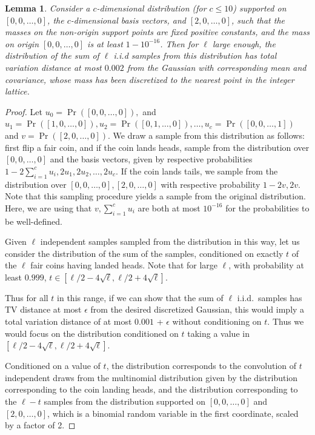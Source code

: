 \documentclass[10pt]{article} %
\theoremstyle{plain}
\newtheorem{lemma}[theorem]{Lemma}
\begin{document}
\begin{lemma}
	\label{lem:clt_new}
	Consider a $c$-dimensional distribution (for $c \le 10$) supported on $[0,0, \ldots, 0]$, the $c$-dimensional basis vectors, and $[2,0, \ldots, 0]$, such that the masses on the non-origin support points are fixed positive constants, and the mass on origin $[0,0, \ldots, 0]$ is at least $1 - 10^{-16}$.  Then for $\ell$ large enough, the distribution of the sum of $\ell$ i.i.d samples from this distribution has total variation distance at most $0.002$ from the Gaussian with corresponding mean and covariance, whose mass has been discretized to the nearest point in the integer lattice.
\end{lemma}
\begin{proof}
	Let $u_0=\Pr([0,0, \ldots, 0]),$ and $u_1=\Pr([1,0,\ldots,0]),u_2=\Pr([0,1,\ldots,0]), \dots, u_c=\Pr([0,0,\ldots,1])$ and $v=\Pr([2,0,\ldots,0])$. We draw a sample from this distribution as follows: first flip a fair coin, and if the coin lands heads, sample from the distribution over $[0,0,\ldots,0]$ and the basis vectors, given by respective probabilities $1-2\sum_{i=1}^cu_i, 2u_1,2u_2,\ldots,2u_c.$ If the coin lands tails, we sample from the distribution over $[0,0,\ldots,0],[2,0,\ldots,0]$ with respective probability $1-2v, 2v.$  Note that this sampling procedure yields a sample from the original distribution. Here, we are using that $v, \sum_{i=1}^cu_i$ are both at most $10^{-16}$ for the probabilities to be well-defined.
	
	Given $\ell$ independent samples sampled from the distribution in this way, let us consider the distribution of the sum of the samples, conditioned on exactly $t$ of the $\ell$ fair coins having landed heads.  Note that for large $\ell$, with probability at least $0.999$, $t \in [\ell/2 - 4\sqrt{\ell},\ell/2+4\sqrt{\ell}].$
	
	Thus for all $t$ in this range,
	if we can show that the sum of $\ell$ i.i.d.\ samples has TV distance at most $\epsilon$ from the desired discretized Gaussian, this would imply a total variation distance of at most $0.001$ + $\epsilon$ without conditioning on $t$. Thus we would focus on the distribution conditioned on $t$ taking a value in $[\ell/2 - 4\sqrt{\ell},\ell/2+4\sqrt{\ell}]$.
	
	Conditioned on a value of $t$, the distribution corresponds to the convolution of $t$ independent draws from the multinomial distribution given by the distribution corresponding to the coin landing heads, and the distribution corresponding to the $\ell-t$ samples from the distribution supported on $[0,0,\ldots, 0]$ and $[2,0,\ldots, 0]$, which is a binomial random variable in the first coordinate, scaled by a factor of 2.
	

\end{proof}
\end{document}
